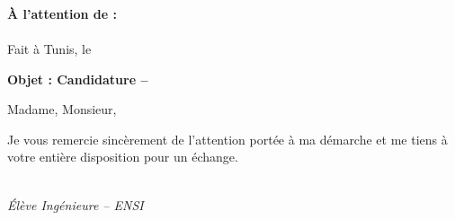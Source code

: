 \documentclass[11pt,a4paper]{article}
\begin{document}

\begin{flushleft}
    \textbf{}\\
    \\
    \href{mailto:\VAR{candidat_email}}{}\\
    \href{https://\VAR{candidat_linkedin}}{}
\end{flushleft}

\vspace{0.3cm}

\begin{flushright}
    \textbf{À l'attention de : }\\
    \textbf{}\\
    \vspace{0.3cm}
    Fait à Tunis, le 
\end{flushright}

\vspace{0.4cm}


\textbf{Objet : Candidature -- }

\vspace{0.5cm}

Madame, Monsieur,


\vspace{0.6cm}

Je vous remercie sincèrement de l’attention portée à ma démarche et me tiens à votre entière disposition pour un échange.

\vspace{1.2cm}

\begin{flushright}
    \textbf{}\\
    \textit{Élève Ingénieure -- ENSI}
\end{flushright}
\end{document}
